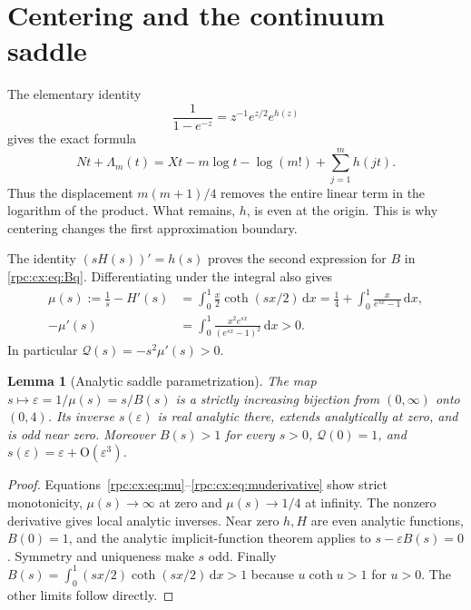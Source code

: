 \documentclass[11pt]{article}
\newtheorem{lemma}[theorem]{Lemma}
\theoremstyle{definition}
\theoremstyle{remark}
\newcommand{\dd}{\,\mathrm d}
\numberwithin{equation}{section}
\begin{document}
\section{Centering and the continuum saddle}\label{rpc:cx:sec:profiles}
The elementary identity
\begin{equation}\label{rpc:cx:eq:center-identity}
 \frac1{1-e^{-z}}=z^{-1}e^{z/2}e^{h(z)}
\end{equation}
gives the exact formula
\begin{equation}\label{rpc:cx:eq:centerexact}
 Nt+\Lambda_m(t)=Xt-m\log t-\log(m!)+\sum_{j=1}^m h(jt).
\end{equation}
Thus the displacement $m(m+1)/4$ removes the entire linear term in the
logarithm of the product. What remains, $h$, is even at the origin.
This is why centering changes the first approximation boundary.

The identity $(sH(s))'=h(s)$ proves the second expression for $B$ in
\eqref{rpc:cx:eq:Bq}. Differentiating under the integral also gives
\begin{align}
 \mu(s):=\frac1s-H'(s)
 &=\int_0^1\frac{x}{2}\coth(sx/2)\dd x
   =\frac14+\int_0^1\frac{x}{e^{sx}-1}\dd x,
       \label{rpc:cx:eq:mu}\\
 -\mu'(s)&=\int_0^1\frac{x^2e^{sx}}{(e^{sx}-1)^2}\dd x>0.
       \label{rpc:cx:eq:muderivative}
\end{align}
In particular $\mathcal Q(s)=-s^2\mu'(s)>0$.

\begin{lemma}[Analytic saddle parametrization]\label{rpc:cx:lem:saddle}
The map $s\mapsto\varepsilon=1/\mu(s)=s/B(s)$ is a strictly increasing
bijection from $(0,\infty)$ onto $(0,4)$.
Its inverse $s(\varepsilon)$ is real analytic there, extends analytically at
zero, and is odd near zero. Moreover $B(s)>1$ for every $s>0$,
$\mathcal Q(0)=1$, and $s(\varepsilon)=\varepsilon+\mathrm O(\varepsilon^3)$.
\end{lemma}
\begin{proof}
Equations~\eqref{rpc:cx:eq:mu}--\eqref{rpc:cx:eq:muderivative} show strict
monotonicity, $\mu(s)\to\infty$ at zero and $\mu(s)\to1/4$ at
infinity. The nonzero derivative gives local analytic inverses.
Near zero $h,H$ are even analytic functions, $B(0)=1$, and the analytic
implicit-function theorem applies to $s-\varepsilon B(s)=0$. Symmetry and
uniqueness make $s$ odd. Finally
$B(s)=\int_0^1(sx/2)\coth(sx/2)\dd x>1$ because
$u\coth u>1$ for $u>0$. The other limits follow directly.
\end{proof}
\end{document}
